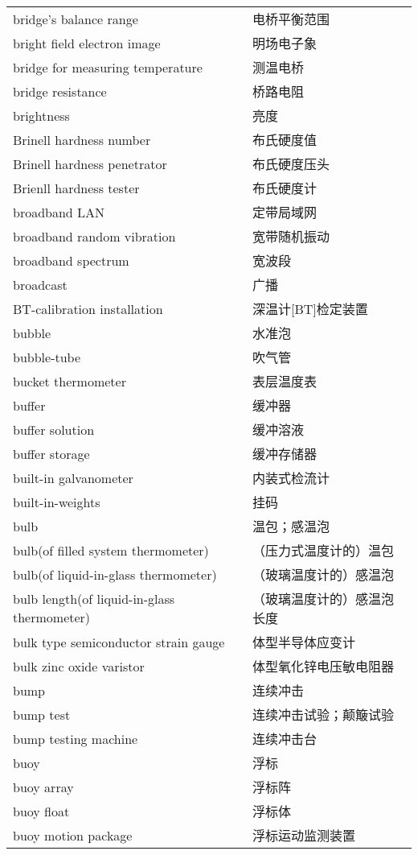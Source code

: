 \documentclass[
]{article}
\begin{document}
\begin{longtable}[]{@{}ll@{}}
bridge's balance range & 电桥平衡范围 \\
bright field electron image & 明场电子象 \\
bridge for measuring temperature & 测温电桥 \\
bridge resistance & 桥路电阻 \\
brightness & 亮度 \\
Brinell hardness number & 布氏硬度值 \\
Brinell hardness penetrator & 布氏硬度压头 \\
Brienll hardness tester & 布氏硬度计 \\
broadband LAN & 定带局域网 \\
broadband random vibration & 宽带随机振动 \\
broadband spectrum & 宽波段 \\
broadcast & 广播 \\
BT-calibration installation & 深温计{[}BT{]}检定装置 \\
bubble & 水准泡 \\
bubble-tube & 吹气管 \\
bucket thermometer & 表层温度表 \\
buffer & 缓冲器 \\
buffer solution & 缓冲溶液 \\
buffer storage & 缓冲存储器 \\
built-in galvanometer & 内装式检流计 \\
built-in-weights & 挂码 \\
bulb & 温包；感温泡 \\
bulb(of filled system thermometer) & （压力式温度计的）温包 \\
bulb(of liquid-in-glass thermometer) & （玻璃温度计的）感温泡 \\
bulb length(of liquid-in-glass thermometer) &
（玻璃温度计的）感温泡长度 \\
bulk type semiconductor strain gauge & 体型半导体应变计 \\
bulk zinc oxide varistor & 体型氧化锌电压敏电阻器 \\
bump & 连续冲击 \\
bump test & 连续冲击试验；颠簸试验 \\
bump testing machine & 连续冲击台 \\
buoy & 浮标 \\
buoy array & 浮标阵 \\
buoy float & 浮标体 \\
buoy motion package & 浮标运动监测装置 \\

\end{longtable}
\end{document}
